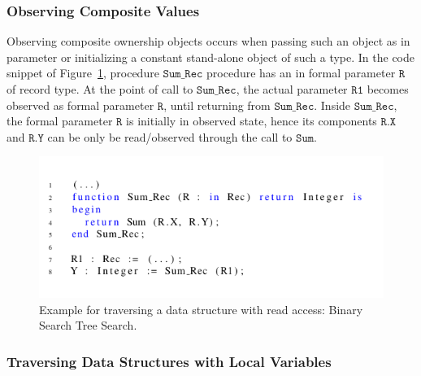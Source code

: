 \documentclass{llncs}
\newcommand\var[1]{\ensuremath{\mathtt{#1}}}
\newcommand{\keyword}[1]{\textsf{#1}}
\begin{document}
   
\subsubsection{Observing Composite Values}
\label{subsubsec:extendingBorrowing}

Observing composite ownership objects occurs when passing such an object as \keyword{in} parameter or initializing a constant stand-alone object of such a type. 
In the code snippet of Figure~\ref{fig:observingComposite}, procedure \var{Sum\_Rec} procedure has an \keyword{in} formal parameter \var{R} of record type.
At the point of call to \var{Sum\_Rec}, the actual parameter \var{R1} becomes observed as formal parameter \var{R}, until returning from \var{Sum\_Rec}. Inside \var{Sum\_Rec},
the formal parameter \var{R} is initially in observed state, hence its components \var{R.X} and \var{R.Y} can be only be read/observed through the call to \var{Sum}.


\begin{figure}[htb!]
\centering
  \captionsetup{justification=centering,margin=0.6cm}
   \includegraphics[width=1\columnwidth]{observingComposite}
   \caption{Example for traversing a data structure with read access: Binary Search Tree Search.}
   \label{fig:observingComposite}
\end{figure}



\subsubsection{Traversing Data Structures with Local Variables}
\end{document}
